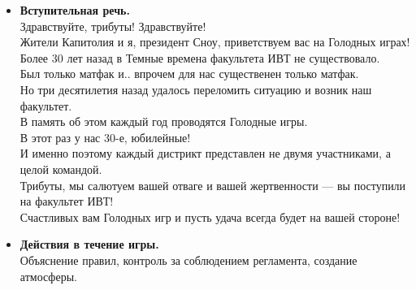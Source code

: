 
\begin{itemize}
\item \textbf{Вступительная речь.}\\
Здравствуйте, трибуты! Здравствуйте!\\
Жители Капитолия и я, президент Сноу, приветствуем вас на Голодных играх!\\
Более 30 лет назад в Темные времена факультета ИВТ не существовало.\\
Был только матфак и.. впрочем для нас существенен только матфак.\\
Но три десятилетия назад удалось переломить ситуацию и возник наш факультет.\\
В память об этом каждый год проводятся Голодные игры.\\
В этот раз у нас 30-е, юбилейные!\\
И именно поэтому каждый дистрикт представлен не двумя участниками, а целой командой.\\
Трибуты, мы салютуем вашей отваге и вашей жертвенности --- вы поступили на факультет ИВТ!\\
Счастливых вам Голодных игр и пусть удача всегда будет на вашей стороне!

\item \textbf{Действия в течение игры.}\\
Объяснение правил, контроль за соблюдением регламента, создание атмосферы.
\end{itemize}